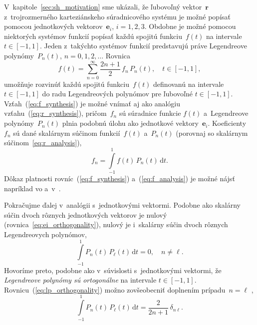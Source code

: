 \documentclass[a4paper, 12pt]{book}
\newcommand{\diff}{\mathrm d}
\let\vec\mathbf
\begin{document}
V~kapitole~\ref{sec:sh_motivation} sme ukázali, že ľubovoľný vektor~$\vec r$
z~trojrozmerného karteziánskeho súradnicového systému je možné popísať pomocou
jednotkových vektorov~$\vec e_i$, $i = 1, 2, 3$.  Obdobne je možné pomocou
niektorých systémov funkcií popísať každú spojitú funkciu~$f(t)$ na intervale
$t \in [-1, 1]$.  Jeden z~takýchto systémov funkcií predstavujú práve
Legendreove polynómy~$P_n(t)$, $n = 0, 1, 2, \dots$  Rovnica
%
\begin{equation}
\label{eq:f_synthesis}
f(t) = \sum_{n = 0}^\infty \frac{2n + 1}{2} \, f_n \, P_n(t){,} \quad t \in 
[-1, 1]{,}
\end{equation}
%
umožňuje rozvinúť každú spojitú funkciu~$f(t)$ definovanú na intervale~$t \in 
[-1, 1]$ do radu Legendreových polynómov
pre ľubovoľné $t \in [-1, 1]$.  Vzťah~(\ref{eq:f_synthesis}) je možné vnímať aj
ako analógiu vzťahu~(\ref{eq:r_synthesis}), pričom~$f_n$ sú súradnice funkcie
$f(t)$ a~Legendreove polynómy~$P_n(t)$ plnia podobnú úlohu ako jednotkové
vektory~$\vec e_i$.  Koeficienty~$f_n$ sú dané skalárnym súčinom funkcií~$f(t)$
a~$P_n(t)$ (porovnaj so skalárnym súčinom~\ref{eq:r_analysis}),
%
\begin{equation}
\label{eq:f_analysis}
f_n = \int\limits_{-1}^1 f(t) \, P_n(t) \, \diff t{.}
\end{equation}
%
Dôkaz platnosti rovníc~(\ref{eq:f_synthesis}) a~(\ref{eq:f_analysis}) je možné 
nájsť napríklad vo \textcite{Freeden2009} 
a~v~\textcite{SansoGeoidDetermination}.

Pokračujme ďalej v~analógii s~jednotkovými vektormi.  Podobne ako skalárny 
súčin dvoch rôznych jednotkových vektorov je nulový 
(rovnica~\ref{eq:ei_orthogonality}), nulový je i~skalárny súčin dvoch rôznych 
Legendreovych polynómov,
%
\begin{equation}
\label{eq:lp_orthogonality}
\int\limits_{-1}^1 P_n(t) \, P_\ell(t) \, \diff t = 0{,} \quad n \neq \ell{.}
\end{equation}
%
Hovoríme preto, podobne ako v~súvislosti s~jednotkovými vektormi, že
\emph{Legendreove polynómy sú ortogonálne} na intervale $t \in [-1, 1].$
Rovnicu~(\ref{eq:lp_orthogonality}) možno zovšeobecniť doplnením prípadu~$n
= \ell$ \parencite[napríklad][]{Hobson},
%
\begin{equation}
\label{eq:lp_orthogonality_2}
\int\limits_{-1}^1 P_n(t) \, P_\ell(t) \, \diff t = \frac{2}{2n + 1} \, 
\delta_{n\ell}{.}
\end{equation}
\end{document}
